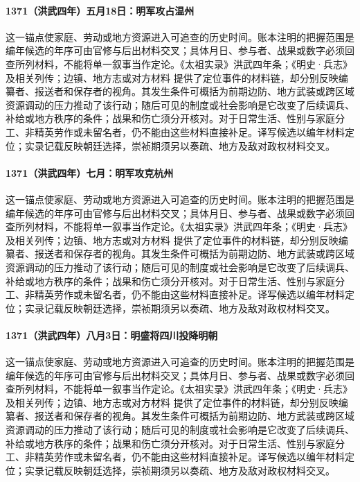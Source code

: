 \paragraph{1371（洪武四年）五月18日：明军攻占温州} 这一锚点使家庭、劳动或地方资源进入可追查的历史时间。账本注明的把握范围是编年候选的年序可由官修与后出材料交叉；具体月日、参与者、战果或数字必须回查所列材料，不能将单一叙事当作定论。《太祖实录》洪武四年条；《明史·兵志》及相关列传；边镇、地方志或对方材料 提供了定位事件的材料链，却分别反映编纂者、报送者和保存者的视角。其发生条件可概括为前期边防、地方武装或跨区域资源调动的压力推动了该行动；随后可见的制度或社会影响是它改变了后续调兵、补给或地方秩序的条件；战果和伤亡须分开核对。对于日常生活、性别与家庭分工、非精英劳作或未留名者，仍不能由这些材料直接补足。译写候选以编年材料定位；实录记载反映朝廷选择，崇祯期须另以奏疏、地方及敌对政权材料交叉。

\paragraph{1371（洪武四年）七月：明军攻克杭州} 这一锚点使家庭、劳动或地方资源进入可追查的历史时间。账本注明的把握范围是编年候选的年序可由官修与后出材料交叉；具体月日、参与者、战果或数字必须回查所列材料，不能将单一叙事当作定论。《太祖实录》洪武四年条；《明史·兵志》及相关列传；边镇、地方志或对方材料 提供了定位事件的材料链，却分别反映编纂者、报送者和保存者的视角。其发生条件可概括为前期边防、地方武装或跨区域资源调动的压力推动了该行动；随后可见的制度或社会影响是它改变了后续调兵、补给或地方秩序的条件；战果和伤亡须分开核对。对于日常生活、性别与家庭分工、非精英劳作或未留名者，仍不能由这些材料直接补足。译写候选以编年材料定位；实录记载反映朝廷选择，崇祯期须另以奏疏、地方及敌对政权材料交叉。

\paragraph{1371（洪武四年）八月3日：明盛将四川投降明朝} 这一锚点使家庭、劳动或地方资源进入可追查的历史时间。账本注明的把握范围是编年候选的年序可由官修与后出材料交叉；具体月日、参与者、战果或数字必须回查所列材料，不能将单一叙事当作定论。《太祖实录》洪武四年条；《明史·兵志》及相关列传；边镇、地方志或对方材料 提供了定位事件的材料链，却分别反映编纂者、报送者和保存者的视角。其发生条件可概括为前期边防、地方武装或跨区域资源调动的压力推动了该行动；随后可见的制度或社会影响是它改变了后续调兵、补给或地方秩序的条件；战果和伤亡须分开核对。对于日常生活、性别与家庭分工、非精英劳作或未留名者，仍不能由这些材料直接补足。译写候选以编年材料定位；实录记载反映朝廷选择，崇祯期须另以奏疏、地方及敌对政权材料交叉。


